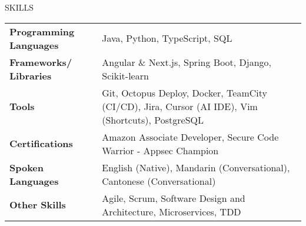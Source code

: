 \documentclass{resume} %
\begin{document}
	\begin{rSection}{SKILLS}
		\begin{tabular}{ @{} >{\bfseries}l @{\hspace{6ex}} l }
			Programming Languages & Java, Python, TypeScript, SQL \\
			Frameworks/ Libraries &  Angular \& Next.js, Spring Boot, Django, Scikit-learn \\
            Tools & Git, Octopus Deploy, Docker, TeamCity (CI/CD), Jira, Cursor (AI IDE), Vim (Shortcuts), PostgreSQL \\
			Certifications & Amazon Associate Developer, Secure Code Warrior - Appsec Champion \\
			Spoken Languages & English (Native), Mandarin (Conversational), Cantonese (Conversational) \\
            Other Skills & Agile, Scrum, Software Design and Architecture, Microservices, TDD \\ 
		\end{tabular}\\
	\end{rSection}
\end{document}
